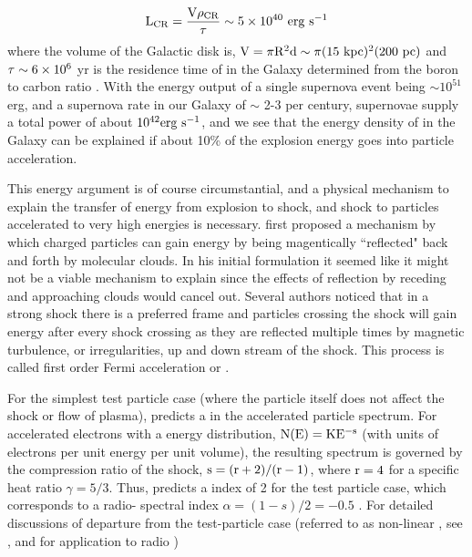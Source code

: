 \begin{equation}\label{eq:crLum}
\rm {L_{CR} = \frac{V\rho_{CR}}{\tau} \sim 5\times 10^{40}~erg~s^{-1}}
\end{equation}
where the volume of the Galactic disk is, ${\rm V = \pi R^2 d \sim  \pi (15~kpc)^2(200~pc)}$ and ${\rm \tau \sim 6\times 10^6}$ yr is the residence time of \crs{} in the Galaxy determined from the boron to carbon ratio \citep{Gaisser90}. With the energy output of a single supernova event being $\sim 10^{51}$ erg, and a supernova rate in our Galaxy of $\sim$ 2-3 per century, supernovae supply a total power of about ${\rm 10^{42} erg~s^{-1}}$, and we see that the energy density of \crs{} in the Galaxy can be explained if about 10\% of the explosion energy goes into particle acceleration.

This energy argument is of course circumstantial, and a physical mechanism to explain the transfer of energy from explosion to shock, and shock to particles accelerated to very high energies is necessary. \cite{Fermi49} first proposed a mechanism by which charged particles can  gain energy by being magentically ``reflected" back and forth by molecular clouds. In his initial formulation it seemed like it might not be a viable mechanism to explain \crs{} since the effects of reflection by receding and approaching clouds would cancel out. Several authors \citep[for example]{Bell78,Blandford78} noticed that in a strong shock there is a preferred frame and particles crossing the shock will gain energy after every shock crossing as they are reflected multiple times by magnetic turbulence, or irregularities, up and down stream of the shock. This process is called first order Fermi acceleration or \dsa{}. 

For the simplest test particle case (where the particle itself does not affect the shock or flow of plasma), \dsa{} predicts a \pl{} in the accelerated particle spectrum. For accelerated electrons with a \pl{} energy distribution, ${\rm N(E) = KE^{-s}}$ (with units of electrons per unit energy per unit volume), the resulting \sync{} spectrum is governed by the compression ratio of the shock, ${\rm s = (r+2)/(r-1)} $, where ${\rm r = 4}$ for a specific heat ratio $\gamma = 5/3$\cite{}. Thus, \dsa{} predicts a \pl{} index of 2 for the test particle case, which corresponds to a radio-\sync{} spectral index $\alpha = (1-s)/2 = -0.5$   \citep[and Chapter \ref{gamAstr:Emiss} ]{Pacholczyk70}. For detailed discussions of departure from the test-particle case (referred to as non-linear \dsa{}, see \cite{Reynolds08},\cite{Malkov01} and \cite{Urosevic14} for application to radio \snrs{})

